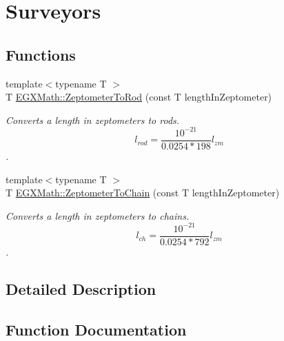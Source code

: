 \hypertarget{group___e_g_x_math-_conversions-_length_conversions-_s_i-_zeptometer-_surveyors}{}\section{Surveyors}
\label{group___e_g_x_math-_conversions-_length_conversions-_s_i-_zeptometer-_surveyors}
\subsection*{Functions}
\begin{DoxyCompactItemize}
\item 
{\footnotesize template$<$typename T $>$ }\\T \mbox{\hyperlink{group___e_g_x_math-_conversions-_length_conversions-_s_i-_zeptometer-_surveyors_gac0c6193e55739ec7f4c3769ebddb65e2}{E\+G\+X\+Math\+::\+Zeptometer\+To\+Rod}} (const T length\+In\+Zeptometer)
\begin{DoxyCompactList}\small\item\em Converts a length in zeptometers to rods. \[ l_{rod}= \frac{10^{-21}}{0.0254 * 198} l_{zm} \]. \end{DoxyCompactList}\item 
{\footnotesize template$<$typename T $>$ }\\T \mbox{\hyperlink{group___e_g_x_math-_conversions-_length_conversions-_s_i-_zeptometer-_surveyors_gaf9fce38080eb9c090004c9df2a5dead1}{E\+G\+X\+Math\+::\+Zeptometer\+To\+Chain}} (const T length\+In\+Zeptometer)
\begin{DoxyCompactList}\small\item\em Converts a length in zeptometers to chains. \[ l_{ch}= \frac{10^{-21}}{0.0254 * 792} l_{zm} \]. \end{DoxyCompactList}\end{DoxyCompactItemize}


\subsection{Detailed Description}


\subsection{Function Documentation}
\mbox{\label{group___e_g_x_math-_conversions-_length_conversions-_s_i-_zeptometer-_surveyors_gaf9fce38080eb9c090004c9df2a5dead1}} 
